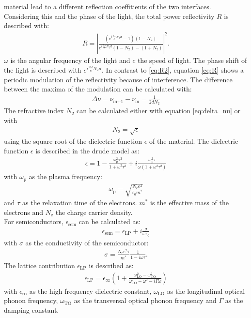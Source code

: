 material lead to a different reflection coeffitients of the two interfaces.\\
Considering this and the phase of the light, the total power reflectivity $R$ is described with:
\begin{align}
    R = \left\lvert \frac{(e^{i\frac{2\omega}{c}N_2d}-1)(1-N_2)}{e^{i\frac{2\omega}{c}N_2d}(1-N_2)-(1+N_2)} \right\rvert^2. \label{eq:R}
\end{align}
$\omega$ is the angular frequency of the light and $c$ the speed of light. 
The phase shift of the light is described with $e^{i\frac{2\omega}{c}N_2d}$. In contrast to \ref{eq:R2}, 
equation \ref{eq:R} shows a periodic modulation of the reflectivity because of interference.
The difference between the maxima of the modulation can be calculated with:
\begin{align}
    \Delta \nu = \nu_{\text{m+1}}-\nu_{\text{m}} = \frac{1}{2dN_2} \label{eq:delta_nu}
\end{align}
The refractive index $N_2$ can be calculated either with equation \ref{eq:delta_nu} or with
\begin{align}
    N_2 = \sqrt{\epsilon} \label{eq:nu}
\end{align}
using the square root of the dielectric function $\epsilon$ of the material.
The dielectric function $\epsilon$ is described in the drude model as:
\begin{align}
    \epsilon = 1-\frac{\omega^2_\text{p}\tau^2}{1+\omega^2\tau^2}+i\frac{\omega^2_\text{p}\tau}{\omega(1+\omega^2\tau^2)}
\end{align}
with $\omega_\text{p}$ as the plasma frequency:
\begin{align}
    \omega_\text{p} = \sqrt{\frac{N_\text{e}e^2}{\epsilon_0m^*}} \label{eq:omega_p}
\end{align}
and $\tau$ as the relaxation time of the electrons. 
$m^*$ is the effective mass of the electrons and $N_\text{e}$ the charge carrier density.
\\
For semiconductors, $\epsilon_\text{sem}$ can be calculated as:
\begin{align}
    \epsilon_\text{sem} = \epsilon_\text{LP} + i\frac{\sigma}{\omega\epsilon_0} \label{eq:epsilon_semiconductor}
\end{align}
with $\sigma$ as the conductivity of the semiconductor:
\begin{align}
    \sigma = \frac{N_\text{e}e^2\tau}{m^*}\frac{1}{1-i\omega\tau}. \label{eq:sigma}
\end{align}
The lattice contribution $\epsilon_\text{LP}$ is described as:
\begin{align}
    \epsilon_\text{LP} = \epsilon_\infty(1+\frac{\omega^2_\text{LO}-\omega^2_\text{TO}}{\omega^2_\text{TO}-\omega^2-i\Gamma\omega}) \label{eq:epsilon_LP}
\end{align}
with $\epsilon_\infty$ as the high frequency dielectric constant, $\omega_\text{LO}$ as the longitudinal optical phonon frequency,
$\omega_\text{TO}$ as the transversal optical phonon frequency and $\Gamma$ as the damping constant.
